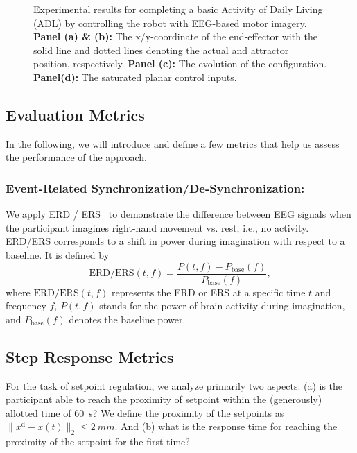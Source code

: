 \begin{figure}[htb]
    \caption{Experimental results for completing a basic Activity of Daily Living (ADL) by controlling the robot with EEG-based motor imagery. \textbf{Panel (a) \& (b):} The x/y-coordinate of the end-effector with the solid line and dotted lines denoting the actual and attractor position, respectively.
    \textbf{Panel (c):} The evolution of the configuration.
    \textbf{Panel(d):} The saturated planar control inputs. }\label{fig:braincontrol:experimental_results:adl_task:brain}
\end{figure}

\subsection{Evaluation Metrics}
In the following, we will introduce and define a few metrics that help us assess the performance of the approach.

\subsubsection{Event-Related Synchronization/De-Synchronization:}
We apply \gls{ERD} / \gls{ERS}~\citep{pfurtscheller1999event} to demonstrate the difference between \gls{EEG} signals when the participant imagines right-hand movement vs. rest, i.e., no activity. \gls{ERD}/\gls{ERS} corresponds to a shift in power during imagination with respect to a baseline. It is defined by
\begin{equation}
    \mathrm{ERD/ERS}(t, f) = \frac{P(t, f) - P_{\mathrm{base}}(f)}{P_{\mathrm{base}}(f)},
\end{equation}
where $\mathrm{ERD/ERS}(t, f)$ represents the \gls{ERD} or \gls{ERS} at a specific time $t$ and frequency $f$, $P(t, f)$ stands for the power of brain activity during imagination, and $P_\mathrm{base}(f)$ denotes the baseline power. 

\subsection{Step Response Metrics}
For the task of setpoint regulation, we analyze primarily two aspects: (a) is the participant able to reach the proximity of setpoint within the (generously) allotted time of \SI{60}{s}? We define the proximity of the setpoints as $\lVert x^\mathrm{d} - x(t)\rVert_2 \leq \SI{2}{mm}$. And (b) what is the response time for reaching the proximity of the setpoint for the first time?
